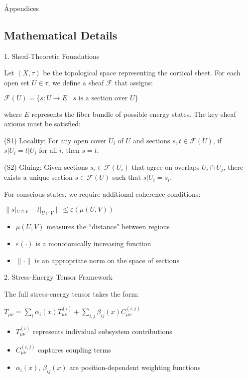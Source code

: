 \h{Appendices}

\begin{refsection}

\section{Mathematical Details}

1. Sheaf-Theoretic Foundations

Let $(X,\tau)$ be the topological space representing the cortical sheet. For each open set $U \in \tau$, we define a sheaf $\mathcal{F}$ that assigns:

$\mathcal{F}(U) = \{s: U \rightarrow E \mid s \text{ is a section over } U\}$

where $E$ represents the fiber bundle of possible energy states. The key sheaf axioms must be satisfied:

(S1) Locality: For any open cover ${U_i}$ of $U$ and sections $s,t \in \mathcal{F}(U)$, if $s|U_i = t|U_i$ for all $i$, then $s = t$.

(S2) Gluing: Given sections $s_i \in \mathcal{F}(U_i)$ that agree on overlaps $U_i \cap U_j$, there exists a unique section $s \in \mathcal{F}(U)$ such that $s|U_i = s_i$.

For conscious states, we require additional coherence conditions:

$\|s|_{U \cap V} - t|_{U \cap V}\| \leq \varepsilon(\mu(U,V))$

\begin{itemize}
\item $\mu(U,V)$ measures the ``distance" between regions
\item $\varepsilon(\cdot)$ is a monotonically increasing function
\item $\|\cdot\|$ is an appropriate norm on the space of sections
\end{itemize}

2. Stress-Energy Tensor Framework

The full stress-energy tensor takes the form:

$T_{\mu\nu} = \sum_i \alpha_i(x)T^{(i)}_{\mu\nu} + \sum_{i,j} \beta_{ij}(x)C^{(i,j)}_{\mu\nu}$

\begin{itemize}
\item $T^{(i)}_{\mu\nu}$ represents individual subsystem contributions
\item $C^{(i,j)}_{\mu\nu}$ captures coupling terms
\item $\alpha_i(x)$, $\beta_{ij}(x)$ are position-dependent weighting functions
\end{itemize}


\end{refsection}
